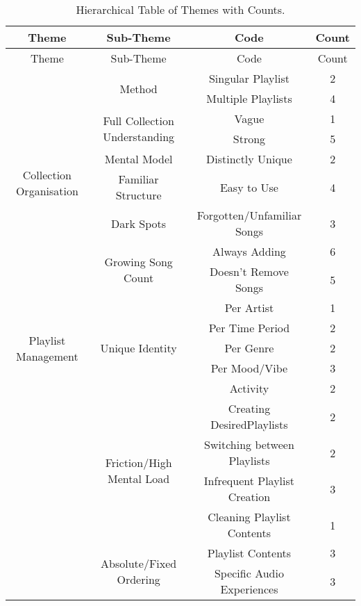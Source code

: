 \begin{longtable}[c]{| c | c | c | c}
    \caption{Hierarchical Table of Themes with Counts.} \\
    \toprule
    Theme & Sub-Theme & Code & Count\\
    \midrule
    \endfirsthead
    
    \toprule
    Theme & Sub-Theme & Code & Count\\
    \midrule
    \endhead

    \multirow{9}{6em}{
        Collection Organisation
    } & \multirow{2}{*}{Method} & Singular Playlist & 2\\* \cmidrule{3-4}
            & & Multiple Playlists & 4 \\*
        \cmidrule{2-4}
        & \multirow{2}{*}{Full Collection Understanding} & Vague & 1\\*  
            \cmidrule{3-4}
            & & Strong & 5 \\*
        \cmidrule{2-4}
        & Mental Model & Distinctly Unique & 2 \\*
        & Familiar Structure & Easy to Use & 4 \\*%
        & Dark Spots & Forgotten/Unfamiliar Songs & 3\\*
        \cmidrule{2-4}
        & \multirow{2}{*}{Growing Song Count} & Always Adding & 6\\*
            \cmidrule{3-4}
            & & Doesn't Remove Songs & 5 \\*
    \midrule

    \multirow{5}{6em}{
        Playlist Management
    } & \multirow{5}{*}{Unique Identity} & Per Artist & 1 \\*
        \cmidrule{3-4}
            & & Per Time Period & 2 \\*
            \cmidrule{3-4}
            & & Per Genre & 2 \\*
            \cmidrule{3-4}
            & & Per Mood/Vibe & 3 \\*
            \cmidrule{3-4}
            & & Activity & 2 \\*
        \cmidrule{2-4}
        & \multirow{4}{*}{Friction/High Mental Load} & Creating DesiredPlaylists & 2\\*
        \cmidrule{3-4}
            & & Switching between Playlists & 2\\*%
            \cmidrule{3-4}
            & & Infrequent Playlist Creation & 3\\*
            \cmidrule{3-4}
            & & Cleaning Playlist Contents & 1\\*
        \cmidrule{2-4}
        & \multirow{2}{*}{Absolute/Fixed Ordering} & Playlist Contents &3\\*
        \cmidrule{3-4}
            & & Specific Audio Experiences & 3\\*
    \midrule
    

\end{longtable}
